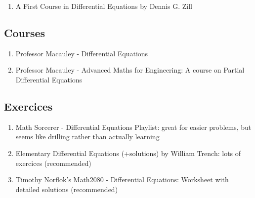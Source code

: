 \documentclass{article}
\begin{document}
\begin{enumerate}
    \item A First Course in Differential Equations by Dennis G. Zill
\end{enumerate}

\subsection{Courses}%
\label{sub:Courses}

\begin{enumerate}
    \item Professor Macauley - Differential Equations
    \item Professor Macauley - Advanced Maths for Engineering: A course
	on Partial Differential Equations
\end{enumerate}

\subsection{Exercices}%
\label{sub:Exercices}

\begin{enumerate}
    \item Math Sorcerer - Differential Equations Playlist: great for easier
	problems, but seems like drilling rather than actually learning
    \item Elementary Differential Equations (+solutions) by William Trench:
	lots of exercices (recommended)
    \item Timothy Norflok's Math2080 - Differential Equations: Worksheet
	with detailed solutions (recommended)
\end{enumerate}

\pagebreak
\end{document}
